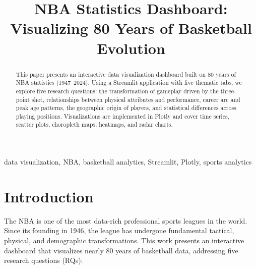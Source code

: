 \documentclass[conference]{IEEEtran}
\begin{document}
\title{NBA Statistics Dashboard:\\
Visualizing 80 Years of Basketball Evolution}

\author{%
  \and
  \and
}

\maketitle

\begin{abstract}
This paper presents an interactive data visualization dashboard built on 80 years of NBA statistics (1947--2024). Using a Streamlit application with five thematic tabs, we explore five research questions: the transformation of gameplay driven by the three-point shot, relationships between physical attributes and performance, career arc and peak age patterns, the geographic origin of players, and statistical differences across playing positions. Visualizations are implemented in Plotly and cover time series, scatter plots, choropleth maps, heatmaps, and radar charts.
\end{abstract}

\begin{IEEEkeywords}
data visualization, NBA, basketball analytics, Streamlit, Plotly, sports analytics
\end{IEEEkeywords}

\section{Introduction}

The NBA is one of the most data-rich professional sports leagues in the world. Since its founding in 1946, the league has undergone fundamental tactical, physical, and demographic transformations. This work presents an interactive dashboard that visualizes nearly 80 years of basketball data, addressing five research questions (RQs):
\end{document}
